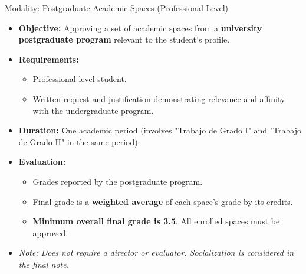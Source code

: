         \begin{frame}{Modality: Postgraduate Academic Spaces (Professional Level)}
          \begin{itemize}
            \item<1-> \textbf{Objective:} Approving a set of academic spaces from a \textbf{university postgraduate program} relevant to the student's profile.
            \item<2-> \textbf{Requirements:}
              \begin{itemize}
                \item<3-> Professional-level student.
                \item<4-> Written request and justification demonstrating relevance and affinity with the undergraduate program.
              \end{itemize}
            \item<5-> \textbf{Duration:} One academic period (involves "Trabajo de Grado I" and "Trabajo de Grado II" in the same period).
            \item<6-> \textbf{Evaluation:}
              \begin{itemize}
                \item<7-> Grades reported by the postgraduate program.
                \item<8-> Final grade is a \textbf{weighted average} of each space's grade by its credits.
                \item<9-> \textbf{Minimum overall final grade is 3.5}. All enrolled spaces must be approved.
              \end{itemize}
            \item<10-> \textit{Note: Does not require a director or evaluator. Socialization is considered in the final note.}
          \end{itemize}
        \end{frame}

